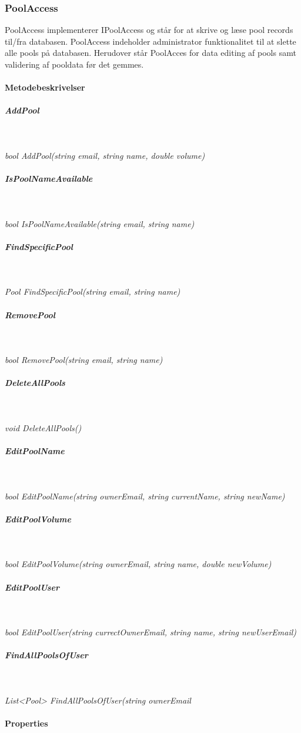 \subsubsection{PoolAccess}
PoolAccess implementerer IPoolAccess og står for at skrive og læse pool records til/fra databasen. PoolAccess indeholder administrator funktionalitet til at slette alle pools på databasen. Herudover står PoolAcces for data editing af pools samt validering af pooldata før det gemmes.


\paragraph{Metodebeskrivelser}

\subparagraph{AddPool}\

\textit{bool AddPool(string email, string name, double volume)}

\subparagraph{IsPoolNameAvailable}\

\textit{bool IsPoolNameAvailable(string email, string name)}

\subparagraph{FindSpecificPool}\

\textit{Pool FindSpecificPool(string email, string name)}

\subparagraph{RemovePool}\

\textit{bool RemovePool(string email, string name)}

\subparagraph{DeleteAllPools}\

\textit{void DeleteAllPools()}

\subparagraph{EditPoolName}\

\textit{bool EditPoolName(string ownerEmail, string currentName, string newName)}

\subparagraph{EditPoolVolume}\

\textit{bool EditPoolVolume(string ownerEmail, string name, double newVolume)}

\subparagraph{EditPoolUser}\

\textit{bool EditPoolUser(string currectOwnerEmail, string name, string newUserEmail)}


\subparagraph{FindAllPoolsOfUser}\

\textit{List<Pool> FindAllPoolsOfUser(string ownerEmail}

\paragraph{Properties}

